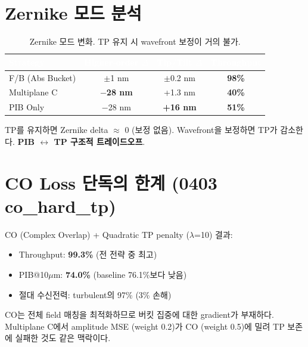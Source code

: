 \documentclass[11pt,a4paper]{article}
\newcommand{\good}[1]{\textcolor{greengood}{\textbf{#1}}}
\newcommand{\bad}[1]{\textcolor{redwarn}{\textbf{#1}}}
\begin{document}
\noindent{}


\section{Zernike 모드 분석}

\begin{table}[H]
\centering
\begin{tabular}{lccc}
\toprule
\rowcolor{tableheader}\textcolor{white}{\textbf{Strategy}} & \textcolor{white}{\textbf{Higher-order $\Delta$}} & \textcolor{white}{\textbf{Tip/Tilt $\Delta$}} & \textcolor{white}{\textbf{Throughput}} \\
\midrule
F/B (Abs Bucket) & $\pm$1 nm & $\pm$0.2 nm & \good{98\%} \\
\rowcolor{tablealt}Multiplane C & \good{$-$28 nm} & +1.3 nm & \bad{40\%} \\
PIB Only & $-$28 nm & \bad{+16 nm} & \bad{51\%} \\
\bottomrule
\end{tabular}
\caption{Zernike 모드 변화. TP 유지 시 wavefront 보정이 거의 불가.}
\end{table}

\noindent TP를 유지하면 Zernike delta $\approx$ 0 (보정 없음).
Wavefront을 보정하면 TP가 감소한다. \textbf{PIB $\leftrightarrow$ TP 구조적 트레이드오프}.


\section{CO Loss 단독의 한계 (0403 co\_hard\_tp)}

CO (Complex Overlap) + Quadratic TP penalty ($\lambda$=10) 결과:
\begin{itemize}
\item Throughput: \good{99.3\%} (전 전략 중 최고)
\item PIB@10$\mu$m: \bad{74.0\%} (baseline 76.1\%보다 낮음)
\item 절대 수신전력: turbulent의 97\% (3\% 손해)
\end{itemize}

\noindent CO는 전체 field 매칭을 최적화하므로 버킷 집중에 대한 gradient가 부재하다.
Multiplane C에서 amplitude MSE (weight 0.2)가 CO (weight 0.5)에 밀려 TP 보존에 실패한 것도 같은 맥락이다.
\end{document}
